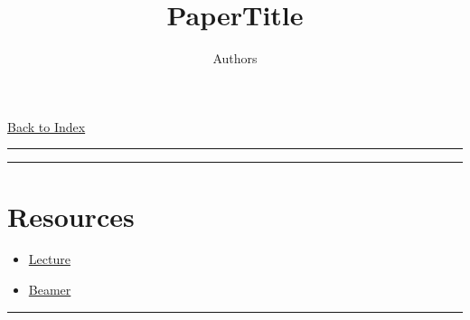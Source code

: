 \documentclass[letterpaper,10pt]{article}
\title{\textbf{PaperTitle}}
\author{Authors}
\newcommand{\panhline}{\begin{center}\rule{\textwidth}{1pt}\end{center}}
\begin{document}
	
	\maketitle
	\href{../index.html}{Back to Index}
	
	\panhline
	\tableofcontents
	\panhline
	
	\section{Resources}
	
	\begin{itemize}
		\item \href{../../Lecture/lecture.pdf}{Lecture}
		\item \href{./beamer.pdf}{Beamer}
	\end{itemize}
	
	\panhline
	
	
	
\end{document}
